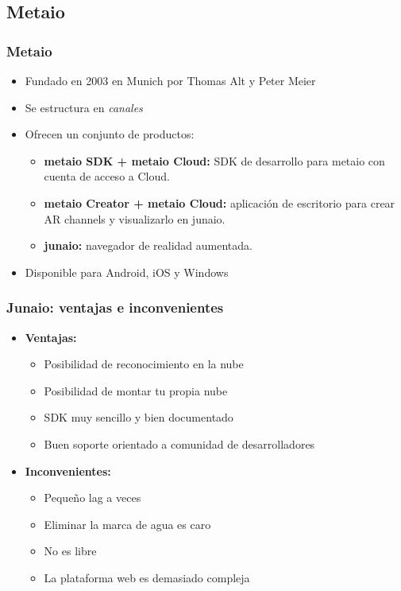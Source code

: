 \subsection*{Metaio}
\frame
{
\frametitle{Metaio}
\begin{itemize}
 \item Fundado en 2003 en Munich por Thomas Alt y Peter Meier
 \item Se estructura en \textit{canales}
 \item Ofrecen un conjunto de productos:
 \begin{itemize}
   \item \textbf{metaio SDK + metaio Cloud:} SDK de desarrollo para metaio con cuenta de acceso a Cloud. 
   \item \textbf{metaio Creator + metaio Cloud:} aplicación de escritorio para crear AR channels y visualizarlo en junaio.
   \item \textbf{junaio:} navegador de realidad aumentada.
 \end{itemize}
 \item Disponible para Android, iOS y Windows
\end{itemize}
}

\frame
{
\frametitle{Junaio: ventajas e inconvenientes}
\begin{itemize}
\item \textbf{Ventajas:}
  \begin{itemize}
   \item Posibilidad de reconocimiento en la nube
   \item Posibilidad de montar tu propia nube
   \item SDK muy sencillo y bien documentado
   \item Buen soporte orientado a comunidad de desarrolladores
  \end{itemize}

\item \textbf{Inconvenientes:}
  \begin{itemize}
   \item Pequeño lag a veces
   \item Eliminar la marca de agua es caro
   \item No es libre
   \item La plataforma web es demasiado compleja 
  \end{itemize}

\end{itemize}
}
